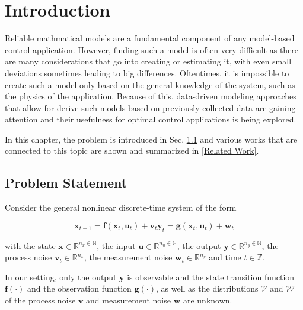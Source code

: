 \chapter{Introduction}
\label{sec:introduction}

Reliable mathmatical models are a fundamental component of any model-based control application. However, finding such a model is often very difficult as there are many considerations that go into creating or estimating it, with even small deviations sometimes leading to big differences. Oftentimes, it is impossible to create such a model only based on the general knowledge of the system, such as the physics of the application. Because of this, data-driven modeling approaches that allow for derive such models based on previously collected data are gaining attention and their usefulness for optimal control applications is being explored.

In this chapter, the problem is introduced in Sec. \ref{Problem Statement} and various works that are connected to this topic are shown and summarized in \ref{Related Work}.

\section{Problem Statement} \label{Problem Statement}

Consider the general nonlinear discrete-time system of the form

\begin{subequations} \label{System equation}
\begin{equation}
\boldsymbol{x}_{t+1} = \boldsymbol{f} \left( \boldsymbol{x}_{t}, \boldsymbol{u}_t \right) + \boldsymbol{v}_{t}
\end{equation}
\begin{equation}
\boldsymbol{y}_{t} = \boldsymbol{g} \left( \boldsymbol{x}_{t}, \boldsymbol{u}_t \right) + \boldsymbol{w}_{t}
\end{equation}
\end{subequations}

with the state $\boldsymbol{x} \in \mathbb{R}^{n_x \in \mathbb{N}}$, the input $\boldsymbol{u} \in \mathbb{R}^{n_u \in \mathbb{N}}$, the output $\boldsymbol{y} \in \mathbb{R}^{n_y \in \mathbb{N}}$, the process noise $\boldsymbol{v}_{t} \in \mathbb{R}^{n_x}$, the measurement noise $\boldsymbol{w}_{t} \in \mathbb{R}^{n_y}$ and time $t \in \mathbb{Z}$. 

In our setting, only the output $\boldsymbol{y}$ is observable and the state transition function $\boldsymbol{f}(\cdot)$ and the observation function $\boldsymbol{g}(\cdot)$, as well as the distributions $\boldsymbol{\mathcal{V}}$ and $\boldsymbol{\mathcal{W}}$ of the process noise $\boldsymbol{v}$ and measurement noise $\boldsymbol{w}$ are unknown.

